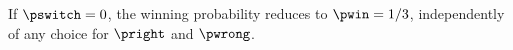 If $\pswitch=0$, the winning probability reduces to $\pwin=1/3$, independently of any choice for $\pright$ and $\pwrong$.
